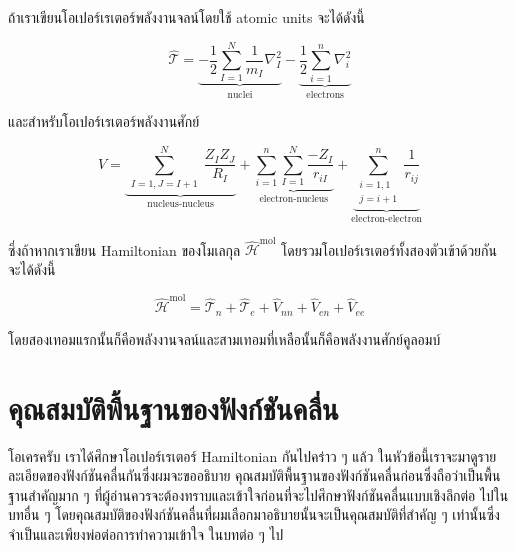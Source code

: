 ถ้าเราเขียนโอเปอร์เรเตอร์พลังงานจลน์โดยใช้ atomic units จะได้ดังนี้

\begin{equation}
    \label{eq:kinetic_operator_au}
    \hat{\mathscr{T}}
    =
    \underbrace
    {
        - \frac{1}{2} \sum_{I=1}^N \frac{1}{m_I} \nabla_I^2
    }_
    {
        \text{nuclei}
    }
    - \underbrace
    {
        \frac{1}{2} \sum_{i=1}^n \nabla_i^2
    }_
    {
        \text{electrons}
    }
\end{equation}

\noindent และสำหรับโอเปอร์เรเตอร์พลังงานศักย์

\begin{equation}
    \label{eq:potential_operator_au}
    \hat{V}
    = \underbrace
    {
        \sum_{\substack{I=1, J=I+1}}^N \frac{Z_I Z_J}{R_I}
    }_
    {
        \text{nucleus-nucleus}
    }
    + \underbrace
    {
        \sum_{i=1}^n \sum_{I=1}^N \frac{-Z_I}{r_{i I}}
    }_
    {
        \text{electron-nucleus}
    }
    + \underbrace
    {
        \sum_{\substack{i=1,1 \\ j=i+1}}^n \frac{1}{r_{i j}}
    }_
    {
        \text{electron-electron}
    }
\end{equation}

\noindent ซึ่งถ้าหากเราเขียน Hamiltonian ของโมเลกุล $\hat{\mathscr{H}}^{\mathrm{mol}}$ โดยรวมโอเปอร์เรเตอร์ทั้งสองตัวเข้าด้วยกัน
จะได้ดังนี้

\begin{equation}
    \label{eq:hamiltonian_operator_molecule}
    \hat{\mathscr{H}}^{\mathrm{mol}}
    =
    \hat{\mathscr{T}}_n
    + \hat{\mathscr{T}}_e
    + \hat{V}_{n n}
    + \hat{V}_{e n}
    + \hat{V}_{e e}
\end{equation}

\noindent โดยสองเทอมแรกนั้นก็คือพลังงานจลน์และสามเทอมที่เหลือนั้นก็คือพลังงานศักย์คูลอมบ์

\section{คุณสมบัติพื้นฐานของฟังก์ชันคลื่น}

โอเครครับ เราได้ศึกษาโอเปอร์เรเตอร์ Hamiltonian กันไปคร่าว ๆ แล้ว ในหัวข้อนี้เราจะมาดูรายละเอียดของฟังก์ชันคลื่นกันซึ่งผมจะขออธิบาย%
คุณสมบัติพื้นฐานของฟังก์ชันคลื่นก่อนซึ่งถือว่าเป็นพื้นฐานสำคัญมาก ๆ ที่ผู้อ่านควรจะต้องทราบและเข้าใจก่อนที่จะไปศึกษาฟังก์ชันคลื่นแบบเชิงลึกต่อ%
ไปในบทอื่น ๆ โดยคุณสมบัติของฟังก์ชันคลื่นที่ผมเลือกมาอธิบายนั้นจะเป็นคุณสมบัติที่สำคัญ ๆ เท่านั้นซึ่งจำเป็นและเพียงพ่อต่อการทำความเข้าใจ%
ในบทต่อ ๆ ไป

